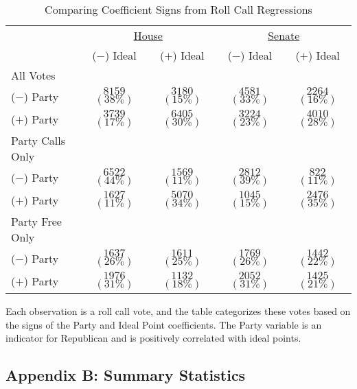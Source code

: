 \documentclass[12pt]{article}
\begin{document}
\begin{table}[!htbp]
\centering
\begin{threeparttable}
\singlespacing
\caption{Comparing Coefficient Signs from Roll Call Regressions}
\label{tab-sorting}
\begin{tabular}{l cc|cc}
\hline
&\multicolumn{2}{c}{\underline{House}}&\multicolumn{2}{c}{\underline{Senate}}\\
& ($-$) Ideal & ($+$) Ideal & ($-$) Ideal & ($+$) Ideal \\
\hline
All Votes \\
\hline
($-$) Party & $8159$ $(38\%)$ & $3180$ $(15\%)$ & $4581$ $(33\%)$ & $2264$ $(16\%)$ \\
($+$) Party & $3739$ $(17\%)$ & $6405$ $(30\%)$ & $3224$ $(23\%)$ & $4010$ $(28\%)$ \\
\hline
Party Calls Only\\
\hline
($-$) Party & $6522$ $(44\%)$ & $1569$ $(11\%)$ & $2812$ $(39\%)$ & $822$ $(11\%)$ \\
($+$) Party & $1627$ $(11\%)$ & $5070$ $(34\%)$ & $1045$ $(15\%)$ & $2476$ $(35\%)$ \\
\hline
Party Free Only\\
\hline
($-$) Party & $1637$ $(26\%)$ & $1611$ $(25\%)$ & $1769$ $(26\%)$ & $1442$ $(22\%)$ \\
($+$) Party & $1976$ $(31\%)$ & $1132$ $(18\%)$ & $2052$ $(31\%)$ & $1425$ $(21\%)$ \\
\hline
\end{tabular}
\begin{tablenotes}
   \item
   Each observation is a roll call vote, and the table categorizes these votes based on the signs of the Party and Ideal Point coefficients.  The Party variable is an indicator for Republican and is positively correlated with ideal points.
 \end{tablenotes}
\end{threeparttable}
\end{table}

\clearpage


\subsection*{Appendix B: Summary Statistics}
%
\end{document}
